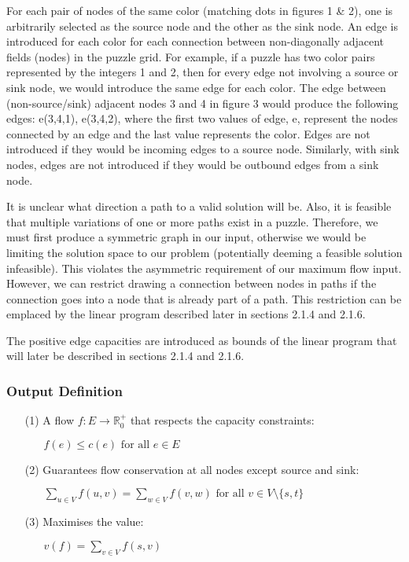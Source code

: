 \documentclass{homeworg}
\begin{document}
For each pair of nodes of the same color (matching dots in figures 1 \& 2), one is arbitrarily selected as the source node and the other as the sink node. An edge is introduced for each color for each connection between non-diagonally adjacent fields (nodes) in the puzzle grid. For example, if a puzzle has two color pairs represented by the integers 1 and 2, then for every edge not involving a source or sink node, we would introduce the same edge for each color. The edge between (non-source/sink) adjacent nodes 3 and 4 in figure 3 would produce the following edges: e(3,4,1), e(3,4,2), where the first two values of edge, e, represent the nodes connected by an edge and the last value represents the color. Edges are not introduced if they would be incoming edges to a source node. Similarly, with sink nodes, edges are not introduced if they would be outbound edges from a sink node.\par
\newpage
It is unclear what direction a path to a valid solution will be. Also, it is feasible that  multiple variations of one or more paths exist in a puzzle. Therefore, we must first produce a symmetric graph in our input, otherwise we would be limiting the solution space to our problem (potentially deeming a feasible solution infeasible). This violates the asymmetric requirement of our maximum flow input. However, we can restrict drawing a connection between nodes in paths if the connection goes into a node that is already part of a path. This restriction can be emplaced by the linear program described later in sections 2.1.4 and 2.1.6. \par
The positive edge capacities are introduced as bounds of the linear program that will later be described in sections 2.1.4 and 2.1.6.\par


\subsubsection{Output Definition}
\begin{enumerate}
    \item[(1)] A flow \(f:E\rightarrow \mathbb{R}_0^+\) that respects the capacity constraints:
        \begin{enumerate}
        	\item[] \(f(e)\leq c(e) \text{ for all } e \in E\)
        \end{enumerate}
    \item[(2)] Guarantees flow conservation at all nodes except source and sink: 
        \begin{enumerate}
        	\item[] \(\displaystyle\sum_{u \in V} f(u, v) = \sum_{w \in V} f(v, w) \text{ for all }v\in V \text{\textbackslash} \{s, t\}\)
        	\end{enumerate}
	\item[(3)] Maximises the value:
        \begin{enumerate}
        	\item[] \(v(f)=\displaystyle\sum_{v \in V}f(s, v)\)
        \end{enumerate}
\end{enumerate}
\end{document}
